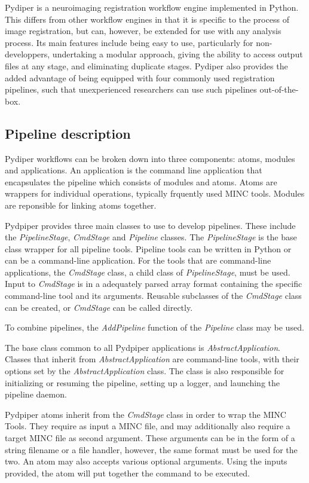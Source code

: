\documentclass{report}
\begin{document}
        Pydiper is a neuroimaging registration workflow engine implemented in
Python. This differs from other workflow engines in that it is specific to the
process of image registration, but can, however, be extended for use with any
analysis process. Its main features include being easy to use, particularly for
non-developpers, undertaking a modular approach, giving the ability to access
output files at any stage, and eliminating duplicate stages. Pydiper also
provides the added advantage of being equipped with four commonly used
registration pipelines, such that unexperienced researchers can use such
pipelines out-of-the-box. 

        \subsection{Pipeline description}
        Pydiper workflows can be broken down into three components: atoms,
modules and applications. An application is the command line application that
encapsulates the pipeline which consists of modules and atoms. Atoms are wrappers for individual operations,
typically frquently used MINC tools. Modules are reponsible for linking
atoms together.

        Pydpiper provides three main classes to use to develop pipelines. These
include the \textit{PipelineStage}, \textit{CmdStage} and \textit{Pipeline} classes. The
\textit{PipelineStage} is the base class wrapper for all pipeline tools.
Pipeline tools can be written in Python or can be a command-line application.
For the tools that are command-line applications, the \textit{CmdStage} class, a
child class of \textit{PipelineStage}, must be used. Input to \textit{CmdStage}
is in a adequately parsed array format containing the specific command-line
tool and its arguments. Reusable subclasses of the \textit{CmdStage} class can be
created, or \textit{CmdStage} can be called directly.

        To combine pipelines, the \textit{AddPipeline} function of the \textit{Pipeline}
        class may be used.

        The base class common to all Pydpiper applications is \textit{AbstractApplication}. 
Classes that inherit from \textit{AbstractApplication} are command-line tools, with their 
options set by the \textit{AbstractApplication} class. The class 
is also responsible for initializing or resuming the pipeline, setting up a logger, and 
launching the pipeline daemon.

        Pydpiper atoms inherit from the \textit{CmdStage} class in order to wrap the MINC Tools. 
They require as input a MINC file, and may additionally also require a target MINC file as second argument. These arguments
can be in the form of a string filename or a file handler, however, the same format must be used for the two. An atom may also accepts various optional arguments. Using the inputs provided, the atom will put together the command to be executed. 
        
\end{document}
